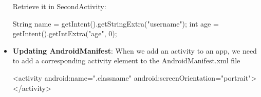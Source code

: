 \documentclass{report}
\begin{document}
\begin{itemize}
\begin{javacode}
            \end{javacode}
            \bigbreak \noindent 
            Retrieve it in SecondActivity:
            \bigbreak \noindent 
            \begin{javacode}
                String name = getIntent().getStringExtra("username");
                int age = getIntent().getIntExtra("age", 0);
            \end{javacode}
        \item \textbf{Updating AndroidManifest}: When we add an activity to an app, we need to add a corresponding activity element to the AndroidManifest.xml file
            \bigbreak \noindent 
            \begin{javacode}
                <activity
                    android:name=".classname"
                    android:screenOrientation="portrait">
                </activity>
            \end{javacode}
    \end{itemize}


    \pagebreak 
\end{document}

